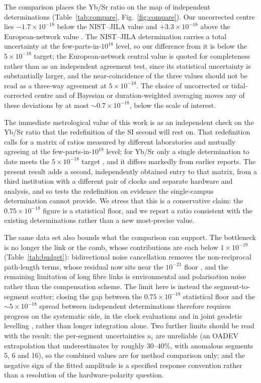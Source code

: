 \documentclass[11pt,a4paper]{article}
\newcommand{\e}[1]{\times 10^{#1}}
\begin{document}
The comparison places the Yb/Sr ratio on the map of independent
determinations (Table~\ref{tab:compare}, Fig.~\ref{fig:compare}). Our
uncorrected centre lies
$-1.7\e{-18}$ below the NIST--JILA value \citep{aeppli2026nist} and
$+3.3\e{-18}$ above the European-network value
\citep{pizzocaro2026european}. The NIST--JILA determination carries a total
uncertainty at the few-parts-in-$10^{18}$ level, so our difference from it
is below the $5\e{-18}$ target; the European-network central value is
quoted for completeness rather than as an independent agreement test,
since its statistical uncertainty is substantially larger, and the
near-coincidence of the three values should not be read as a three-way
agreement at $5\e{-18}$. The choice of uncorrected or tidal-corrected
centre and of Bayesian or duration-weighted averaging moves any of these
deviations by at most $\sim0.7\e{-18}$, below the scale of interest.

The immediate metrological value of this work is as an independent check
on the Yb/Sr ratio that the redefinition of the SI second will rest on.
That redefinition calls for a matrix of ratios measured by different
laboratories and mutually agreeing at the few-parts-in-$10^{18}$ level;
for Yb/Sr only a single determination to date meets the $5\e{-18}$ target
\citep{aeppli2026nist}, and it differs markedly from earlier reports. The
present result adds a second, independently obtained entry to that
matrix, from a third institution with a different pair of clocks and
separate hardware and analysis, and so tests the redefinition on evidence
the single-campus determination cannot provide. We stress that this is a
conservative claim: the $0.75\e{-18}$ figure is a statistical floor, and
we report a ratio consistent with the existing determinations rather than
a new most-precise value.

The same data set also bounds what the comparison can support. The
bottleneck is no longer the link or the comb, whose contributions are each
below $1\e{-19}$ (Table~\ref{tab:budget}): bidirectional noise
cancellation removes the non-reciprocal path-length terms, whose residual
now sits near the $10^{-21}$ floor \citep{schioppo2022cavities,
chen2026dissemination}, and the remaining limitation of long fibre links
is environmental and polarisation noise rather than the compensation
scheme. The limit here is instead the segment-to-segment
scatter; closing the gap between the $0.75\e{-18}$ statistical floor and
the $\sim5\e{-18}$ spread between independent determinations therefore
requires progress on the systematic side, in the clock evaluations
\citep{zhu2026yb, jia2026sr} and in joint geodetic levelling
\citep{denker2018geodetic}, rather than
longer integration alone. Two further limits should be read with the
result: the per-segment uncertainties $u_i$ are unreliable (an OADEV
extrapolation that underestimates by roughly $30$--$40\%$, with anomalous
segments 5, 6 and 16), so the combined values are for method comparison
only; and the negative sign of the fitted amplitude is a specified
response convention rather than a resolution of the hardware-polarity
question.
\end{document}
